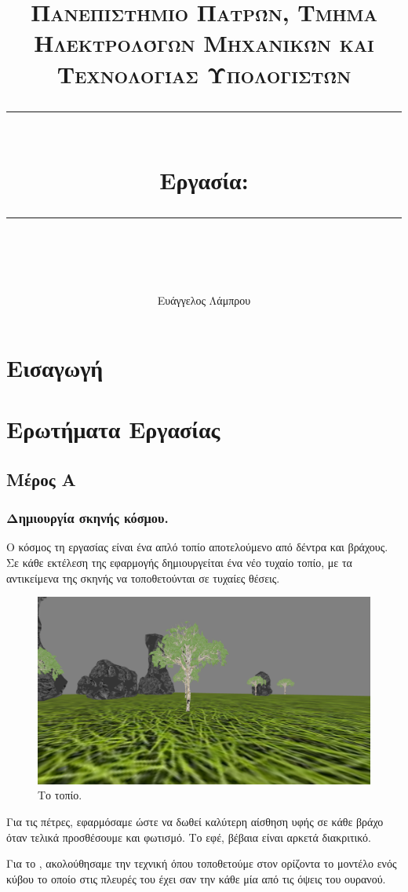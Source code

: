 \documentclass[11pt]{scrartcl} %
\title{	
	\normalfont\normalsize
	\textsc{Πανεπιστήμιο Πατρών, Τμήμα Ηλεκτρολόγων Μηχανικών και Τεχνολογίας Υπολογιστών}\\ %
	\vspace{25pt} %
	\rule{\linewidth}{0.5pt}\\ %
	\vspace{20pt} %
	{\Large Εργασία: \en{Pokemon}}\\ %
	\vspace{12pt} %
	\rule{\linewidth}{2pt}\\ %
	\vspace{12pt} %
}
\author{\LARGE Ευάγγελος Λάμπρου \\ \en{UP1066519}} %
\date{} %
\newenvironment{centerimg}[1]%
{%
    \begin{figure}[H]
        #1
    \begin{center}
}%
{%
    \end{center}
    \end{figure}
}
\begin{document}
\maketitle 

\tableofcontents

\newpage

\section{Εισαγωγή}

\section{Ερωτήματα Εργασίας}

\subsection{Μέρος Α}

\subsubsection{Δημιουργία σκηνής κόσμου.}

Ο κόσμος τη εργασίας είναι ένα απλό τοπίο αποτελούμενο από δέντρα και βράχους. Σε κάθε εκτέλεση της εφαρμογής
δημιουργείται ένα νέο τυχαίο τοπίο, με τα αντικείμενα της σκηνής να τοποθετούνται σε τυχαίες θέσεις. 

\begin{centerimg}{\caption{Το τοπίο.}}
    \includegraphics[width=.7\textwidth]{./assets/scene.png}
\end{centerimg}

Για τις πέτρες, εφαρμόσαμε  
ώστε να δωθεί καλύτερη αίσθηση υφής σε κάθε βράχο όταν 
τελικά προσθέσουμε και φωτισμό. Το εφέ, βέβαια 
είναι αρκετά διακριτικό.

Για το , ακολούθησαμε την τεχνική όπου τοποθετούμε στον ορίζοντα το μοντέλο ενός κύβου το οποίο 
στις πλευρές του έχει σαν  την κάθε μία από τις όψεις του ουρανού.
\end{document}

